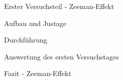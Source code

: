 \documentclass[pdftex, a4paper,11pt, twoside, ngerman]{report}
\begin{document}
         
         
  \begin{chapter}{Erster Versuchsteil - Zeeman-Effekt}
    \label{chp:Photoeffekt}
   
   
   
    \begin{section}{Aufbau und Justage}
      \label{chp:photoeffekt:sec:AufbauJustage}
      
      
      
    \end{section}
   
   
   
    \begin{section}{Durchführung}
      \label{chp:Aufbau:sec:ERSTERTEIL:subsec:UNTERTEIL}
      
      
      
    \end{section}
   
   
   
    \begin{section}{Auswertung des ersten Versuchstages}
      \label{chp:Photoeffekt:sec:Auswertung}
      
      
      
    \end{section}
   
   
   
    \begin{section}{Fazit - Zeeman-Effekt}
      \label{chp:Photoeffekt:sec:Fazit}
      
      
      
    \end{section}
   
  \end{chapter}
 
 
 
\end{document}
